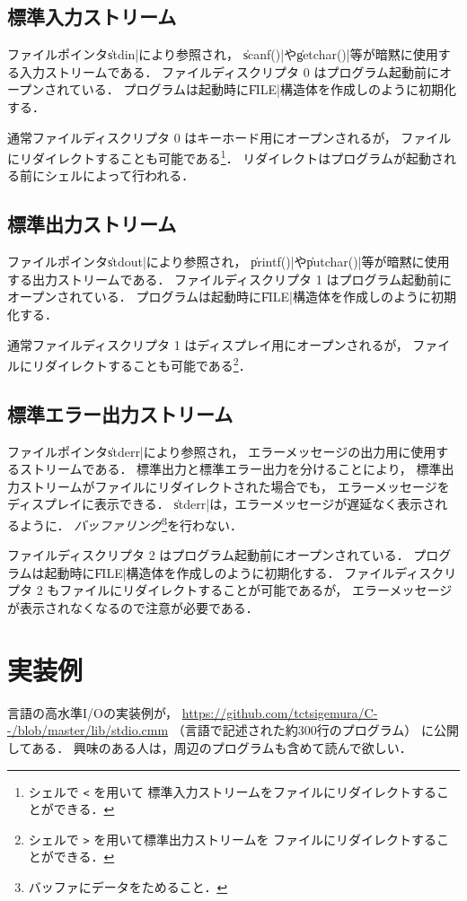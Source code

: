 \subsection{標準入力ストリーム}
ファイルポインタ\|stdin|により参照され，
\|scanf()|や\|getchar()|等が暗黙に使用する入力ストリームである．
ファイルディスクリプタ 0 はプログラム起動前にオープンされている．
プログラムは起動時に\|FILE|構造体を作成しのように初期化する．

通常ファイルディスクリプタ 0 はキーホード用にオープンされるが，
ファイルにリダイレクトすることも可能である\footnote{
シェルで \texttt{<} を用いて
標準入力ストリームをファイルにリダイレクトすることができる．}．
リダイレクトはプログラムが起動される前にシェルによって行われる．

\subsection{標準出力ストリーム}
ファイルポインタ\|stdout|により参照され，
\|printf()|や\|putchar()|等が暗黙に使用する出力ストリームである．
ファイルディスクリプタ 1 はプログラム起動前にオープンされている．
プログラムは起動時に\|FILE|構造体を作成しのように初期化する．

通常ファイルディスクリプタ 1 はディスプレイ用にオープンされるが，
ファイルにリダイレクトすることも可能である\footnote{
シェルで \texttt{>} を用いて標準出力ストリームを
ファイルにリダイレクトすることができる．
}．

\subsection{標準エラー出力ストリーム}
ファイルポインタ\|stderr|により参照され，
エラーメッセージの出力用に使用するストリームである．
標準出力と標準エラー出力を分けることにより，
標準出力ストリームがファイルにリダイレクトされた場合でも，
エラーメッセージをディスプレイに表示できる．
\|stderr|は，エラーメッセージが遅延なく表示されるように．
\emph{バッファリング}\footnote{バッファにデータをためること．}を行わない．

ファイルディスクリプタ 2 はプログラム起動前にオープンされている．
プログラムは起動時に\|FILE|構造体を作成しのように初期化する．
ファイルディスクリプタ 2 もファイルにリダイレクトすることが可能であるが，
エラーメッセージが表示されなくなるので注意が必要である．

\section{実装例}
\cmm 言語の高水準I/Oの実装例が，
\url{https://github.com/tctsigemura/C--/blob/master/lib/stdio.cmm}
（\cmm 言語で記述された約300行のプログラム）
に公開してある．
興味のある人は，周辺のプログラムも含めて読んで欲しい．

